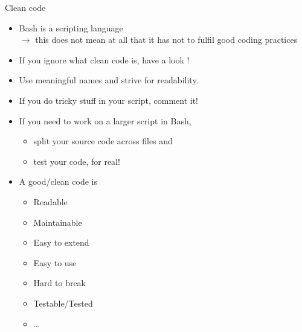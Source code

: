 \begin{frame}{Clean code}
    \vspace{-3mm}
    \begin{itemize}
        \setlength{\itemsep}{1mm}
        \item Bash is a scripting language\\ $\to$ this does not mean at all that it has not to fulfil good coding practices
        \item If you ignore what clean code is, have a look ! 
        \item Use meaningful names and strive for readability.
        \item If you do tricky stuff in your script, comment it!
        \item If you need to work on a larger script in Bash,
              \begin{itemize}
                  \item split your source code across files and
                  \item test your code, for real! 
              \end{itemize}
        \item A good/clean code is
              \begin{itemize}
                  \item Readable
                  \item Maintainable
                  \item Easy to extend
                  \item Easy to use
                  \item Hard to break
                  \item Testable/Tested
                  \item \ldots
              \end{itemize}
    \end{itemize}
\end{frame}















